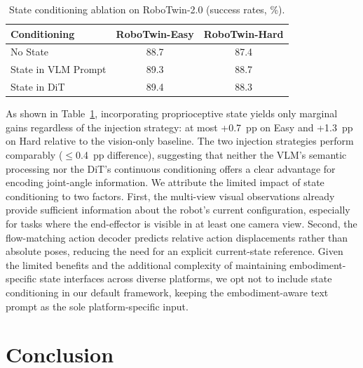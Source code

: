 \documentclass{article}
\begin{document}
\begin{table}[!th]
\centering
\caption{State conditioning ablation on RoboTwin-2.0 (success rates, \%).}
\label{tab:state_conditioning}
\small
\begin{tabular}{lcc}
\toprule
Conditioning & RoboTwin-Easy & RoboTwin-Hard \\
\midrule
No State & 88.7 & 87.4 \\
State in VLM Prompt & 89.3 & 88.7 \\
State in DiT & 89.4 & 88.3 \\
\bottomrule
\end{tabular}
\end{table}

As shown in Table~\ref{tab:state_conditioning}, incorporating proprioceptive state yields only marginal gains regardless of the injection strategy: at most +0.7~pp on Easy and +1.3~pp on Hard relative to the vision-only baseline.
The two injection strategies perform comparably ($\leq$0.4~pp difference), suggesting that neither the VLM's semantic processing nor the DiT's continuous conditioning offers a clear advantage for encoding joint-angle information.
We attribute the limited impact of state conditioning to two factors.
First, the multi-view visual observations already provide sufficient information about the robot's current configuration, especially for tasks where the end-effector is visible in at least one camera view.
Second, the flow-matching action decoder predicts relative action displacements rather than absolute poses, reducing the need for an explicit current-state reference.
Given the limited benefits and the additional complexity of maintaining embodiment-specific state interfaces across diverse platforms, we opt not to include state conditioning in our default framework, keeping the embodiment-aware text prompt as the sole platform-specific input.


\section{Conclusion}
\end{document}
